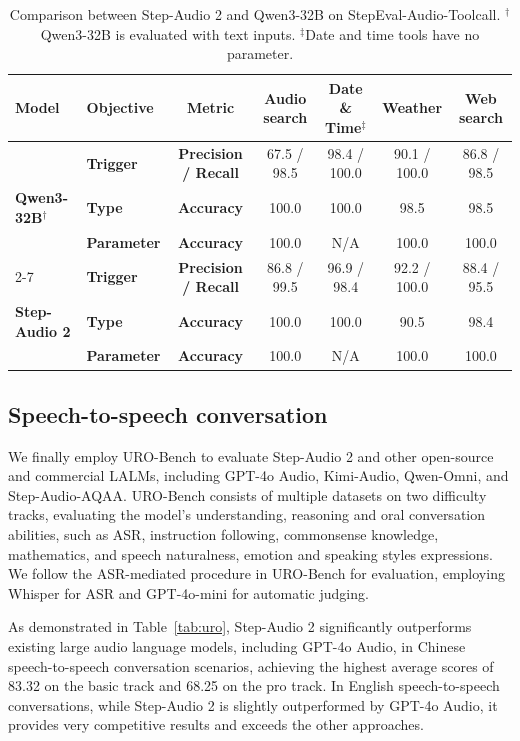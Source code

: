 \begin{table}[htb]
    \centering
    \caption{Comparison between Step-Audio 2 and Qwen3-32B on StepEval-Audio-Toolcall. $^\dagger$Qwen3-32B is evaluated with text inputs. $^\ddagger$Date and time tools have no parameter.}
    \begin{tabular}{llccccc}
    \toprule
        \textbf{Model} & \textbf{Objective} & \textbf{Metric} 
        & \textbf{Audio search} & \textbf{Date \& Time$^\ddagger$} & \textbf{Weather} & \textbf{Web search}  \\
        \midrule
        & \textbf{Trigger} & \textbf{Precision / Recall}& 67.5 / 98.5 & 98.4 / 100.0 & 90.1 / 100.0 & 86.8 / 98.5 \\
        \textbf{Qwen3-32B}$^\dagger$  & \textbf{Type} & \textbf{Accuracy} & 100.0 & 100.0 & 98.5 & 98.5 \\
        & \textbf{Parameter} & \textbf{Accuracy} & 100.0 & N/A & 100.0 & 100.0\\
        \cmidrule(lr){2-7}
        & \textbf{Trigger} &\textbf{Precision / Recall} & 86.8 / 99.5 & 96.9 / 98.4 & 92.2 / 100.0 & 88.4 / 95.5 \\
        \textbf{Step-Audio 2}  & \textbf{Type} & \textbf{Accuracy}  & 100.0 & 100.0 & 90.5 & 98.4 \\
        & \textbf{Parameter} & \textbf{Accuracy}  & 100.0& N/A& 100.0& 100.0\\
        \bottomrule
    \end{tabular}
    \label{tab:toolcall}
\end{table}


\subsection{Speech-to-speech conversation}
We finally employ URO-Bench \cite{yan2025urobenchcomprehensivebenchmarkendtoend}
to evaluate Step-Audio 2 and other open-source and commercial LALMs, including GPT-4o Audio, Kimi-Audio, Qwen-Omni, and Step-Audio-AQAA.
URO-Bench consists of multiple datasets on two difficulty tracks, evaluating the model's understanding, reasoning and oral conversation abilities, such as ASR, instruction following, commonsense knowledge, mathematics, and speech naturalness, emotion and speaking styles expressions.
We follow the ASR-mediated procedure in URO-Bench for evaluation, employing Whisper for ASR and GPT-4o-mini for automatic judging.


As demonstrated in Table~\ref{tab:uro}, Step-Audio 2 significantly outperforms existing large audio language models, including GPT-4o Audio, in Chinese speech-to-speech conversation scenarios, achieving the highest average scores of 83.32 on the basic track and 68.25 on the pro track. In English speech-to-speech conversations, while Step-Audio 2 is slightly outperformed by GPT-4o Audio, it provides very competitive results and exceeds the other approaches.

